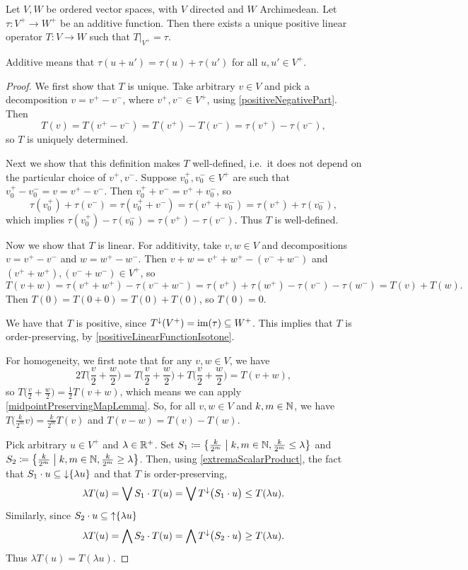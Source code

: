\begin{proposition} \label{positiveOperatorExtension}
Let $V,W$ be ordered vector spaces, with $V$ directed and $W$ Archimedean. Let $\tau: V^+ \to W^+$ be an additive function. Then there exists a unique positive linear operator $T: V\to W$ such that $T|_{V^+} = \tau$.
\end{proposition}
Additive means that $\tau(u+u') = \tau(u) + \tau(u')$ for all $u,u'\in V^+$.
\begin{proof}
We first show that $T$ is unique. Take arbitrary $v\in V$ and pick a decomposition $v= v^+ - v^-$, where $v^+, v^-\in V^+$, using \ref{positiveNegativePart}. Then
\[ T(v) = T(v^+ - v^-) = T(v^+) - T(v^-) = \tau(v^+) - \tau(v^-), \]
so $T$ is uniquely determined.

Next we show that this definition makes $T$ well-defined, i.e.\ it does not depend on the particular choice of $v^+,v^-$. Suppose $v_0^+, v_0^-\in V^+$ are such that $v_0^+ - v_0^- = v = v^+ - v^-$. Then $v_0^+ + v^- = v^+ + v_0^-$, so
\[ \tau(v_0^+) + \tau(v^-) = \tau(v_0^+ + v^-) = \tau(v^+ + v_0^-) = \tau(v^+) + \tau(v_0^-), \]
which implies $\tau(v_0^+) - \tau(v_0^-) = \tau(v^+) - \tau(v^-)$. Thus $T$ is well-defined.

Now we show that $T$ is linear. For additivity, take $v,w\in V$ and decompositions $v = v^+ - v^-$ and $w = w^+ - w^-$. Then $v+w = v^+ + w^+ - (v^- + w^-)$ and $(v^+ + w^+), (v^- + w^-)\in V^+$, so
\[ T(v+w) = \tau(v^+ + w^+) - \tau(v^- + w^-) = \tau(v^+) + \tau(w^+) - \tau(v^-) - \tau(w^-) = T(v) + T(w). \]
Then $T(0) = T(0+0) = T(0)+T(0)$, so $T(0) = 0$.

We have that $T$ is positive, since $T^\downarrow(V^+) = \operatorname{im}(\tau) \subseteq W^+$. This implies that $T$ is order-preserving, by \ref{positiveLinearFunctionIsotone}.

For homogeneity, we first note that for any $v,w\in V$, we have
\[ 2T\Big(\frac{v}{2} + \frac{w}{2}\Big) = T\Big(\frac{v}{2} + \frac{w}{2}\Big) + T\Big(\frac{v}{2} + \frac{w}{2}\Big) = T(v + w), \]
so $T\big(\frac{v}{2} + \frac{w}{2}\big) = \frac{1}{2}T(v + w)$, which means we can apply \ref{midpointPreservingMapLemma}. So, for all $v, w\in V$ and $k,m\in \mathbb{N}$, we have $T\big(\frac{k}{2^m}v\big) = \frac{k}{2^m}T(v)$ and $T(v-w) = T(v)-T(w)$.

Pick arbitrary $u\in V^+$ and $\lambda \in \mathbb{R}^+$. Set $S_1 \defeq \setbuilder{\frac{k}{2^m}}{k,m\in \N, \frac{k}{2^m}\leq \lambda}$ and $S_2 \defeq \setbuilder{\frac{k}{2^m}}{k,m\in \N, \frac{k}{2^m}\geq \lambda}$. Then, using \ref{extremaScalarProduct}, the fact that $S_1\cdot u \subseteq \operatorname{\downarrow}\{\lambda u\}$ and that $T$ is order-preserving,
\[ \lambda T(u) = \bigvee S_1\cdot T(u) = \bigvee T^\downarrow\big(S_1\cdot u\big) \leq T(\lambda u). \]
Similarly, since $S_2\cdot u \subseteq \operatorname{\uparrow}\{\lambda u\}$
\[ \lambda T(u) = \bigwedge S_2\cdot T(u) = \bigwedge T^\downarrow\big(S_2\cdot u\big) \geq T(\lambda u). \]
Thus $\lambda T(u) = T(\lambda u)$.


\end{proof}
